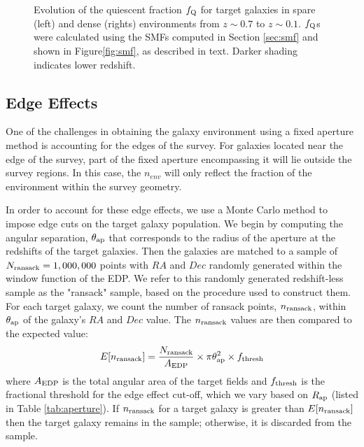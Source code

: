 \documentclass{emulateapj}
\begin{document}
\begin{figure*}
    \begin{center}
        \leavevmode
        \caption{Evolution of the quiescent fraction $f_{\rm{Q}}$ for target galaxies in spare (left) and dense (rights) environments
from $z \sim 0.7$ to $z \sim 0.1$. $f_{\rm{Q}}$s were calculated using the SMFs computed in Section \ref{sec:smf} and shown in Figure\ref{fig:smf}, as described in text. Darker shading indicates lower redshift.}         \label{fig:qf}
    \end{center}
\end{figure*}

\subsection{Edge Effects} \label{sec:edgeeffect}
One of the challenges in obtaining the galaxy environment using a fixed aperture method is accounting for the edges of the survey.
For galaxies located near the edge of the survey, part of the fixed aperture encompassing it will lie outside the survey regions. 
In this case, the $n_{env}$ will only reflect the fraction of the environment within the survey geometry.

In order to account for these edge effects, we use a Monte Carlo method to impose edge cuts on the target 
galaxy population. 
We begin by computing the angular separation, $\theta_{\rm{ap}}$ that corresponds to the radius of the 
aperture at the redshifts of the target galaxies.
Then the galaxies are matched to a sample of $N_{\rm{ransack}}=1,000,000$ points with $RA$ and $Dec$
 randomly generated within the window function of the EDP.  
We refer to this randomly generated redshift-less sample as the "ransack" sample, based on the procedure 
used to construct them. 
For each target galaxy, we count the number of ransack points, $n_{\rm{ransack}}$, within $\theta_{\rm{ap}}$
of the galaxy's $RA$ and $Dec$ value.
The $n_{\rm{ransack}}$ values are then compared to the expected value:
\begin{equation} \label{eq:ransack}
E[n_{\rm{ransack}}] = \frac{N_{\rm{ransack}}}{A_{\rm{EDP}}}\times {\pi \theta_{\rm{ap}}^2} \times f_{\rm{thresh}} 
\end{equation} 
where $A_{\rm{EDP}}$ is the total angular area of the target fields and $f_{\rm{thresh}}$ is the fractional 
threshold for the edge effect cut-off, which we vary based on $R_{\rm{ap}}$ (listed in Table \ref{tab:aperture}).
If $n_{\rm{ransack}}$ for a target galaxy is greater than $E[n_{\rm{ransack}}]$ then the target galaxy remains
in the sample; otherwise, it is discarded from the sample. 
\end{document}
